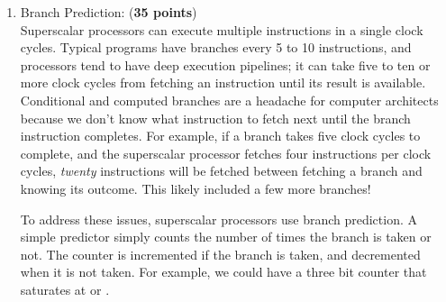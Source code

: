 \documentclass{article}
\begin{document}
\begin{enumerate}
          Going forward, we want to make this opportunity to everyone, whether or not you use AI.
          Here are \emph{five} ways you can get that extra credit point:
          \begin{enumerate}
              \item Include your prompts to AI assistants as described above.
              \item Tell us why you didn't use an AI assistant or didn't find it helpful.
              \item Write a few sentences that you think would be the best advice you could
                    give to a student starting this assignment based on your experience of
                    completing it.
              \item Identify a question that you thought was particularly helpful or
                    pointlessly tedious, and give us a few sentences saying why.
              \item Write something else that you think is worthy of extra-credit.
                    Mark it clearly as your response to the \textbf{Extra Credit} part
                    of this question.
          \end{enumerate}
    \item Branch Prediction: (\textbf{35 points})\label{q:branch}\\
          Superscalar processors can execute multiple instructions in a single clock cycles.
          Typical programs have branches every 5 to 10 instructions, and processors tend to have
          deep execution pipelines; it can take five to ten or more clock cycles from fetching an
          instruction until its result is available.
          Conditional and computed branches are a headache for computer architects because we don't
          know what instruction to fetch next until the branch instruction completes.
          For example, if a branch takes five clock cycles to complete, and the superscalar processor
          fetches four instructions per clock cycles, \emph{twenty} instructions will be fetched between
          fetching a branch and knowing its outcome.  This likely included a few more branches!
          \par
          To address these issues, superscalar processors use branch prediction.
          A simple predictor simply counts the number of times the branch is taken or not.
          The counter is incremented if the branch is taken, and decremented when it is not taken.
          For example, we could have a three bit counter that saturates at  or .

\end{enumerate}
\end{document}
